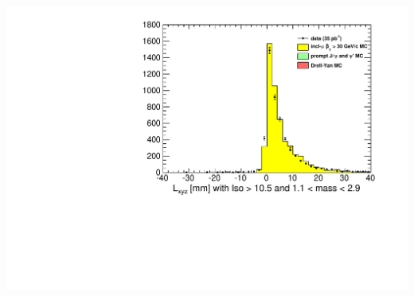 \documentclass[compress]{beamer}
\begin{document}
\begin{frame}
\begin{columns}
\includegraphics[width=\linewidth]{lowdimuon_lxyz_midmass_noniso.pdf}
\end{columns}
\end{frame}
\end{document}
